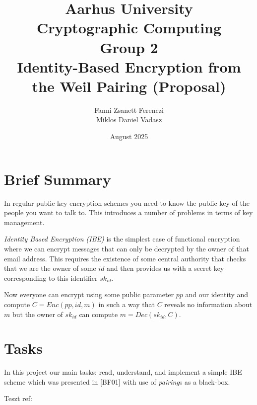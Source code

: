 \documentclass{article}
\title{Aarhus University \\ Cryptographic Computing \\ Group 2\\
Identity-Based Encryption from the Weil Pairing (Proposal)}
\author{ Fanni Zsanett Ferenczi \\ Miklos Daniel Vadasz}
\date{August 2025}
\begin{document}
    \maketitle

    \section{ Brief Summary}

    In regular public-key encryption schemes you need to know the public key
    of the people you want to talk to. This introduces a number of problems in terms of key management.

    \textit{Identity Based Encryption (IBE)} is the simplest case of functional encryption where we can encrypt
    messages that can only be decrypted by the owner of that email address. This requires the existence
    of some central authority that checks that we are the owner of some $id$  and
    then provides us with a secret key corresponding to this identifier $sk_{id}$.

    Now everyone can encrypt using some public parameter $pp$ and our identity and compute $C = Enc(pp, id, m)$ in such a way that $C$ reveals no information about $m$ but the owner of $sk_{id}$ can compute $m = Dec(sk_{id}, C)$.

    \section{Tasks}

    In this project our main tasks: read, understand, and implement a simple IBE scheme which was presented
    in [BF01] with use of  \textit{pairing}s as a black-box.

    \printbibliography

    Teszt ref: \cite{ref01}
\end{document}
